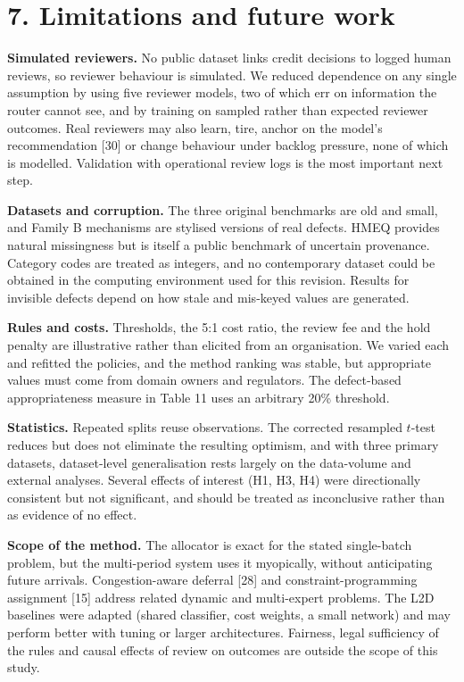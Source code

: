 \documentclass[
  11pt,
]{article}
\begin{document}
\hypertarget{limitations-and-future-work}{%
\section{7. Limitations and future
work}\label{limitations-and-future-work}}

\textbf{Simulated reviewers.} No public dataset links credit decisions
to logged human reviews, so reviewer behaviour is simulated. We reduced
dependence on any single assumption by using five reviewer models, two
of which err on information the router cannot see, and by training on
sampled rather than expected reviewer outcomes. Real reviewers may also
learn, tire, anchor on the model's recommendation {[}30{]} or change
behaviour under backlog pressure, none of which is modelled. Validation
with operational review logs is the most important next step.

\textbf{Datasets and corruption.} The three original benchmarks are old
and small, and Family B mechanisms are stylised versions of real
defects. HMEQ provides natural missingness but is itself a public
benchmark of uncertain provenance. Category codes are treated as
integers, and no contemporary dataset could be obtained in the computing
environment used for this revision. Results for invisible defects depend
on how stale and mis-keyed values are generated.

\textbf{Rules and costs.} Thresholds, the 5:1 cost ratio, the review fee
and the hold penalty are illustrative rather than elicited from an
organisation. We varied each and refitted the policies, and the method
ranking was stable, but appropriate values must come from domain owners
and regulators. The defect-based appropriateness measure in Table 11
uses an arbitrary 20\% threshold.

\textbf{Statistics.} Repeated splits reuse observations. The corrected
resampled \(t\)-test reduces but does not eliminate the resulting
optimism, and with three primary datasets, dataset-level generalisation
rests largely on the data-volume and external analyses. Several effects
of interest (H1, H3, H4) were directionally consistent but not
significant, and should be treated as inconclusive rather than as
evidence of no effect.

\textbf{Scope of the method.} The allocator is exact for the stated
single-batch problem, but the multi-period system uses it myopically,
without anticipating future arrivals. Congestion-aware deferral {[}28{]}
and constraint-programming assignment {[}15{]} address related dynamic
and multi-expert problems. The L2D baselines were adapted (shared
classifier, cost weights, a small network) and may perform better with
tuning or larger architectures. Fairness, legal sufficiency of the rules
and causal effects of review on outcomes are outside the scope of this
study.
\end{document}
